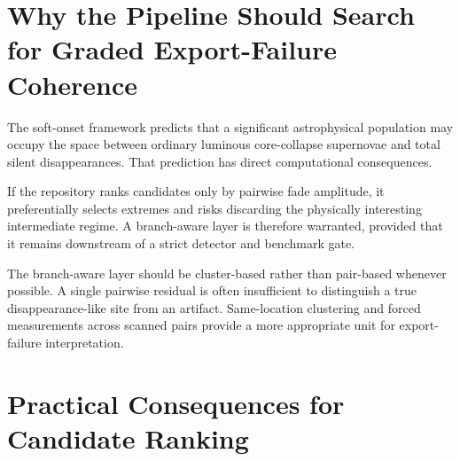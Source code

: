 \documentclass[11pt]{article}
\begin{document}
\section{Why the Pipeline Should Search for Graded Export-Failure Coherence}

The soft-onset framework predicts that a significant astrophysical population may occupy the space between ordinary luminous core-collapse supernovae and total silent disappearances. That prediction has direct computational consequences.

If the repository ranks candidates only by pairwise fade amplitude, it preferentially selects extremes and risks discarding the physically interesting intermediate regime. A branch-aware layer is therefore warranted, provided that it remains downstream of a strict detector and benchmark gate.

The branch-aware layer should be cluster-based rather than pair-based whenever possible. A single pairwise residual is often insufficient to distinguish a true disappearance-like site from an artifact. Same-location clustering and forced measurements across scanned pairs provide a more appropriate unit for export-failure interpretation.

\section{Practical Consequences for Candidate Ranking}
\end{document}
